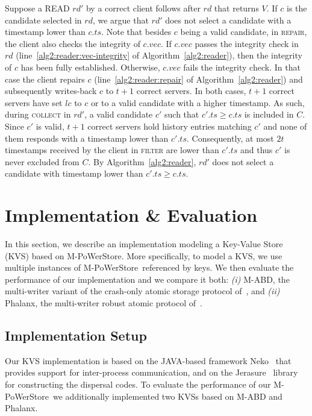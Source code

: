 \documentclass[10pt,conference,compsocconf]{IEEEtran}
\newcommand{\mprotocol}{M-PoWerStore}
\begin{document}
Suppose a \textsc{READ} $rd'$ by a correct client follows after $rd$ that returns $V$. If $c$ is the candidate selected in $rd$, we argue that $rd'$ does not select a candidate with a timestamp lower than $c.ts$. Note that besides $c$ being a valid candidate, in \textsc{repair}, the client also checks the integrity of $c.vec$. If $c.vec$ passes the integrity check in $rd$ (line~\ref{alg2:reader:vec-integrity} of Algorithm~\ref{alg2:reader}), then the integrity of $c$ has been fully established. Otherwise, $c.vec$ fails the integrity check. In that case the client repairs $c$ (line~\ref{alg2:reader:repair} of Algorithm~\ref{alg2:reader}) and subsequently writes-back $c$ to $t+1$ correct servers. In both cases, $t+1$ correct servers have set $lc$ to $c$ or to a valid candidate with a higher timestamp. As such, during \textsc{collect} in $rd'$, a valid candidate $c'$ such that $c'.ts \geq c.ts$ is included in $C$. Since $c'$ is valid, $t+1$ correct servers hold history entries matching $c'$ and none of them responds with a timestamp lower than $c'.ts$. Consequently, at most $2t$ timestamps received by the client in \textsc{filter} are lower than $c'.ts$ and thus $c'$ is never excluded from $C$. By Algorithm~\ref{alg2:reader}, $rd'$ does not select a candidate with timestamp lower than $c'.ts \geq c.ts$.



\section{Implementation \& Evaluation}\label{sec:implementation}

In this section, we describe an implementation modeling a Key-Value Store (KVS) based on \mprotocol. More specifically, to model a KVS, we use multiple instances of \mprotocol\ referenced by keys. We then evaluate the performance of our implementation  and we compare it both: \emph{(i)} M-ABD, the multi-writer variant of the crash-only atomic storage protocol of~\cite{ABND95}, and \emph{(ii)} Phalanx, the multi-writer robust atomic protocol of~\cite{Phalanx}.

\subsection{Implementation Setup}\label{subsec:setup}

Our KVS implementation is based on the JAVA-based framework Neko~\cite{Neko09} that provides support for inter-process communication, and on the Jerasure~\cite{Jerasure08} library for constructing the dispersal codes.
To evaluate the performance of our \mprotocol\, we additionally implemented two KVSs  based on M-ABD and Phalanx.
\end{document}
